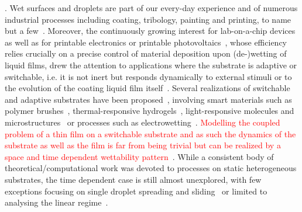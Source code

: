 \documentclass[amsmath,amssymb,showpacs,prf,superscriptaddress, longbibliography]{revtex4-1} %
\newcommand{\REV}[1]{\textcolor{red}{#1}}
\begin{document}
\maketitle

\newcommand{\ts}{\textsuperscript}

. Wet surfaces and droplets are part of our every-day experience and of numerous industrial processes including coating, tribology, painting and printing, to name but a few~\cite{grossFluidFilmLubrication1980a,szeriFluidFilmLubrication2010,quereFluidCoatingFiber1999,dasilvasobrinhoStudyDefectsUltrathin1999,singhInkjetPrintingProcess2010,wijshoffDynamicsPiezoInkjet2010}. 
Moreover, the continuously growing interest for lab-on-a-chip devices~\cite{samieiReviewDigitalMicrofluidics2016,fockeLabonaFoilMicrofluidicsThin2010} as well as for printable electronics or printable photovoltaics~\cite{luechingerGraphenestabilizedCopperNanoparticles2008,ronsinFormationCrystallineBulk2022}, whose efficiency relies crucially on a precise control of material deposition upon (de-)wetting of liquid films, drew the attention to applications where the substrate is adaptive or switchable, i.e. it is not inert but responds dynamically to external stimuli or to the evolution of the coating liquid film itself~\cite{buttAdaptiveWettingAdaptation2018}. 
Several realizations of switchable and adaptive substrates have been proposed~\cite{xinReversiblySwitchableWettability2010}, involving smart materials such as polymer brushes~\cite{stuartEmergingApplicationsStimuliresponsive2010}, thermal-responsive hydrogels~\cite{chenThermalresponsiveHydrogelSurface2010}, light-responsive molecules and microstructures~\cite{ichimuraLightDrivenMotionLiquids2000} or processes such as electrowetting~\cite{mugeleElectrowettingConvenientWay2005}.
\REV{Modelling the coupled problem of a thin film on a switchable substrate and as such the dynamics of the substrate as well as the film is far from being trivial but can be realized by a space and time dependent wettability pattern~\cite{grawitterSteeringDropletsSubstrates2021}}. 
While a consistent body of theoretical/computational work was devoted to processes on static heterogeneous substrates, the time dependent case is still almost unexplored, with few exceptions focusing on single droplet spreading and sliding~\cite{grawitterSteeringDropletsSubstrates2021,grawitterDropletsSubstratesOscillating2021,thieleGradientDynamicsModel2020} or limited to analysing the linear regime~\cite{sumanDynamicsThinLiquid2006}.
\end{document}

